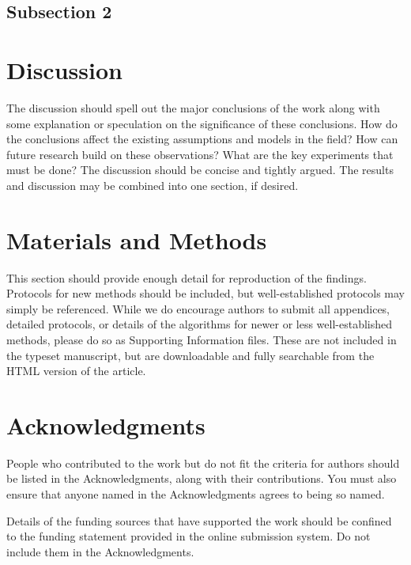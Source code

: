 \documentclass[10pt]{article}
\begin{document}
\subsection*{Subsection 2}

\section*{Discussion}

The discussion should spell out the major conclusions of the work along with some 
explanation or speculation on the significance of these conclusions. How do the 
conclusions affect the existing assumptions and models in the field? How can future research 
build on these observations? What are the key experiments that must be done? The discussion should 
be concise and tightly argued. The results and discussion may be combined into one section, if desired.

\section*{Materials and Methods}

This section should provide enough detail for reproduction of the findings. Protocols 
for new methods should be included, but well-established protocols may simply be referenced. While we do 
encourage authors to submit all appendices, detailed protocols, or details of the algorithms for newer or less 
well-established methods, please do so as Supporting Information files. These are not included in the typeset manuscript, 
but are downloadable and fully searchable from the HTML version of the article.

\section*{Acknowledgments}

People who contributed to the work but do not fit the criteria for authors should be listed in the 
Acknowledgments, along with their contributions. You must also ensure that anyone named in the Acknowledgments 
agrees to being so named.

Details of the funding sources that have supported the work should be confined to the funding statement 
provided in the online submission system. Do not include them in the Acknowledgments.
\end{document}
